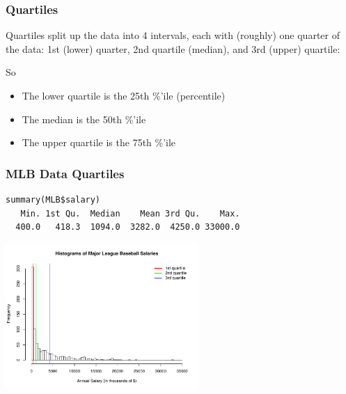 \documentclass[handout]{beamer}
\newcommand{\blue}[1]{\textcolor{blue2}{#1}}
\begin{document}
\begin{frame}
\frametitle{Quartiles}
\blue{Quartiles} split up the data into 4 intervals, each with (roughly) one quarter of the data: 1st (lower) quarter, 2nd quartile (median), and 3rd (upper) quartile:

\vspace{0.5cm}

So
\begin{itemize}
\pause \item The lower quartile is the 25th \%'ile (percentile)
\pause \item The median is the 50th \%'ile
\pause \item The upper quartile is the 75th \%'ile
\end{itemize}

\end{frame}


\begin{frame}[fragile]
\frametitle{MLB Data Quartiles}

\begin{verbatim}
summary(MLB$salary)
   Min. 1st Qu.  Median    Mean 3rd Qu.    Max.
  400.0   418.3  1094.0  3282.0  4250.0 33000.0
\end{verbatim}

\begin{center}
\includegraphics[height=5.5cm]{figure/MLB_quartiles.pdf}
\end{center}

\end{frame}
\end{document}
